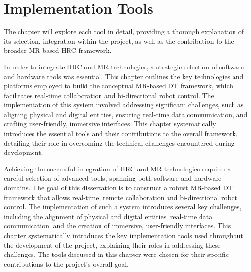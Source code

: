 

\chapter{Implementation Tools}%
\label{chapter:tools}


\begin{introduction}
    The chapter will explore each tool in detail, providing a thorough explanation of its selection, integration within the project, as well as the contribution to the broader \ac{MR}-based \ac{HRC} framework.


    In order to integrate \ac{HRC} and \ac{MR} technologies, a strategic selection of software and hardware tools was essential. This chapter outlines the key technologies and platforms employed to build the conceptual \ac{MR}-based \ac{DT} framework, which facilitates real-time collaboration and bi-directional robot control. The implementation of this system involved addressing significant challenges, such as aligning physical and digital entities, ensuring real-time data communication, and crafting user-friendly, immersive interfaces. This chapter systematically introduces the essential tools and their contributions to the overall framework, detailing their role in overcoming the technical challenges encountered during development.


\end{introduction}

Achieving the successful integration of \ac{HRC} and \ac{MR} technologies requires a careful selection of advanced tools, spanning both software and hardware domains. The goal of this dissertation is to construct a robust \ac{MR}-based \ac{DT} framework that allows real-time, remote collaboration and bi-directional robot control. The implementation of such a system introduces several key challenges, including the alignment of physical and digital entities, real-time data communication, and the creation of immersive, user-friendly interfaces. This chapter systematically introduces the key implementation tools used throughout the development of the project, explaining their roles in addressing these challenges. 
The tools discussed in this chapter were chosen for their specific contributions to the project’s overall goal. 

